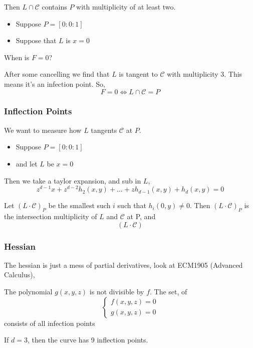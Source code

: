 \documentclass{article}
\begin{document}
Then $L \cap \mathcal{C}$ contains $P$ with multiplicity of at least two.
\begin{itemize}
  \item Suppose $P = [0 : 0 : 1]$
  \item Suppose that $L$ is $x = 0$
\end{itemize}

\begin{question}
  When is $F = 0$?
\end{question}

After some cancelling we find that $L$ is tangent to $\mathcal{C}$ with multiplicity 3. This means it's an infection point. So,
$$ F = 0 \iff L \cap \mathcal{C} = P $$

\subsubsection{Inflection Points}
We want to measure how $L$ tangents $\mathcal{C}$ at $P$.
\begin{itemize}
  \item Suppose $P = [0 : 0 : 1]$
  \item and let $L$ be $x = 0$
\end{itemize}

Then we take a taylor expansion, and sub in $L$,
$$ z^{d- 1}x + z^{d-2}h_2(x, y) + \dots + zh_{d-1}(x, y) + h_d(x, y) = 0$$

\begin{ndefi}[]
  Let $(L \cdot\mathcal{C})_P$ be the smallest such $i$ such that $h_i(0, y) \ne 0$. Then $(L \cdot \mathcal{C})_P$ is the intersection multiplicity of $L$ and $\mathcal{C}$ at P, and
  $$ (L \cdot \mathcal{C}) $$
\end{ndefi}

\subsubsection{Hessian}
The hessian is just a mess of partial derivatives, look at ECM1905 (Advanced Calculus),

\begin{nthm}[]
  The polynomial $g(x, y, z)$ is not divisible by $f$. The set, of
  $$ \begin{cases}
    f(x, y, z) = 0\\
    g(x, y ,z) = 0
  \end{cases} $$
  consists of all infection points
\end{nthm}

\begin{nthm}[]
  If $d = 3$, then the curve has 9 inflection points.
\end{nthm}
\end{document}

